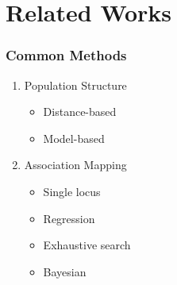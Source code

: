 \documentclass[xcolor=dvipsnames, professionalfont]{beamer}
\begin{document}
\section{Related Works}
\begin{frame}
\frametitle{Common Methods}
\begin{enumerate}
\item Population Structure
	\begin{itemize}
	\item Distance-based
	\item Model-based
	\end{itemize} \pause
\item Association Mapping
	\begin{itemize}
	\item Single locus
	\item Regression
	\item Exhaustive search
	\item Bayesian
	\end{itemize}
\end{enumerate}
\end{frame}
\end{document}
